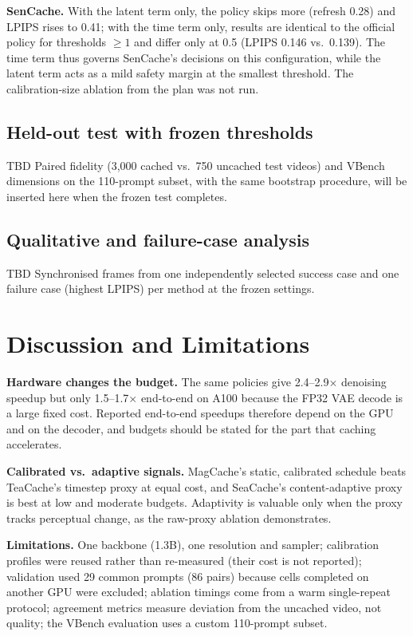\documentclass[11pt,a4paper]{article}
\newcommand{\pending}{\textcolor{draftorange}{\textsf{TBD}}}
\begin{document}
\textbf{SenCache.} With the latent term only, the policy skips more (refresh 0.28) and LPIPS rises to 0.41; with the time
term only, results are identical to the official policy for thresholds $\geq1$ and differ only at 0.5 (LPIPS 0.146 vs.\
0.139). The time term thus governs SenCache's decisions on this configuration, while the latent term acts as a mild safety
margin at the smallest threshold. The calibration-size ablation from the plan was not run.

\subsection{Held-out test with frozen thresholds}
\pending{} Paired fidelity (3{,}000 cached vs.\ 750 uncached test videos) and VBench dimensions on the 110-prompt subset,
with the same bootstrap procedure, will be inserted here when the frozen test completes.

\subsection{Qualitative and failure-case analysis}
\pending{} Synchronised frames from one independently selected success case and one failure case (highest LPIPS) per
method at the frozen settings.

\section{Discussion and Limitations}
\textbf{Hardware changes the budget.} The same policies give 2.4--2.9$\times$ denoising speedup but only 1.5--1.7$\times$
end-to-end on A100 because the FP32 VAE decode is a large fixed cost. Reported end-to-end speedups therefore depend on the
GPU and on the decoder, and budgets should be stated for the part that caching accelerates.

\textbf{Calibrated vs.\ adaptive signals.} MagCache's static, calibrated schedule beats TeaCache's timestep proxy at equal
cost, and SeaCache's content-adaptive proxy is best at low and moderate budgets. Adaptivity is valuable only when the proxy
tracks perceptual change, as the raw-proxy ablation demonstrates.

\textbf{Limitations.} One backbone (1.3B), one resolution and sampler; calibration profiles were reused rather than
re-measured (their cost is not reported); validation used 29 common prompts (86 pairs) because cells completed on another
GPU were excluded; ablation timings come from a warm single-repeat protocol; agreement metrics measure deviation from the
uncached video, not quality; the VBench evaluation uses a custom 110-prompt subset.
\end{document}
